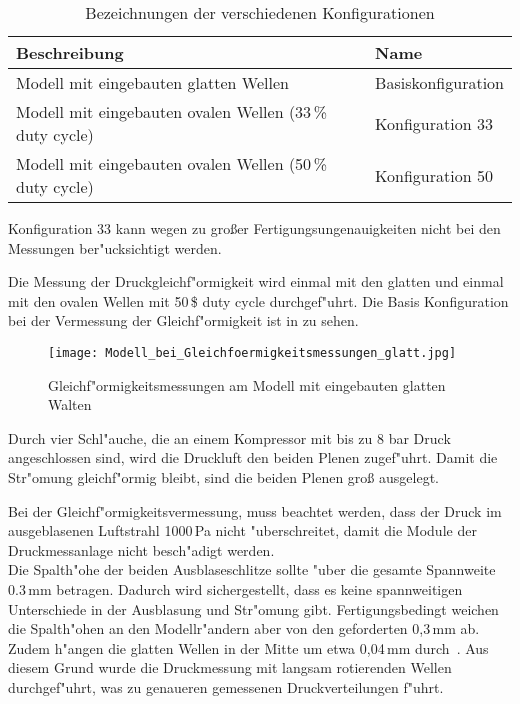 \begin{table}[h]
	\centering
	\begin{tabular}{ll}
		\toprule
		Beschreibung & Name\\
		\midrule
		Modell mit eingebauten glatten Wellen & Basiskonfiguration\\
		Modell mit eingebauten ovalen Wellen (33\,\% duty cycle) & Konfiguration 33\\
		Modell mit eingebauten ovalen Wellen (50\,\% duty cycle) & Konfiguration 50\\
		\bottomrule
	\end{tabular}
	\caption{Bezeichnungen der verschiedenen Konfigurationen}
	\label{tab:zuordnung}
\end{table}
Konfiguration 33 kann wegen zu gro\ss{}er Fertigungsungenauigkeiten nicht bei den Messungen ber"ucksichtigt werden.

Die Messung der Druckgleichf"ormigkeit wird einmal mit den glatten und einmal mit den ovalen Wellen mit 50\,\$ duty cycle durchgef"uhrt. Die Basis Konfiguration bei der Vermessung der Gleichf"ormigkeit ist in   zu sehen.

\begin{figure}[h]
	\centering
	\texttt{[image: Modell\_bei\_Gleichfoermigkeitsmessungen\_glatt.jpg]}
	\caption{Gleichf"ormigkeitsmessungen am Modell mit eingebauten glatten Walten}
	\label{fig:Modell_bei_Gleichf"ormigkeitsmessungen}
\end{figure}

Durch vier Schl"auche, die an einem Kompressor mit bis zu 8 bar Druck angeschlossen sind, wird die Druckluft den beiden Plenen zugef"uhrt. Damit die Str"omung gleichf"ormig bleibt, sind die beiden Plenen gro\ss{} ausgelegt. 

Bei der Gleichf"ormigkeitsvermessung, muss beachtet werden, dass der Druck im ausgeblasenen Luftstrahl 1000\,Pa nicht "uberschreitet, damit die Module der Druckmessanlage nicht besch"adigt werden.\\
Die Spalth"ohe der beiden Ausblaseschlitze sollte "uber die gesamte Spannweite 0.3\,mm betragen. Dadurch wird sichergestellt, dass es keine spannweitigen Unterschiede in der Ausblasung und Str"omung gibt.
Fertigungsbedingt weichen die Spalth"ohen an den Modellr"andern aber von den geforderten 0,3\,mm ab. Zudem h"angen die glatten Wellen in der Mitte um etwa 0,04\,mm durch~\cite{Bilges.2018}. Aus diesem Grund wurde die Druckmessung mit langsam rotierenden Wellen durchgef"uhrt, was zu genaueren gemessenen Druckverteilungen f"uhrt.

